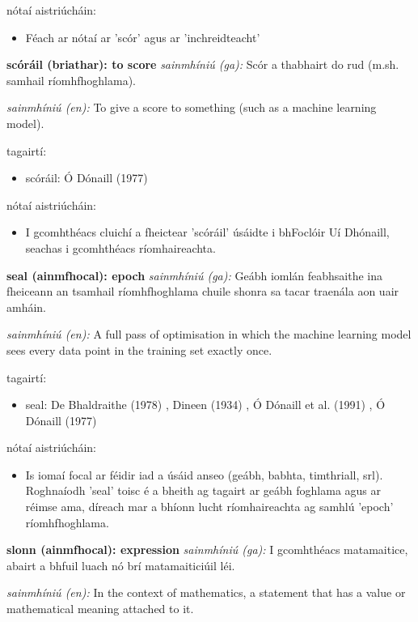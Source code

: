 \documentclass{article}
\begin{document}
nótaí aistriúcháin:
\begin{itemize}
	\item Féach ar nótaí ar 'scór' agus ar 'inchreidteacht'
\end{itemize}


\textbf{scóráil (briathar): to score}
\textit{sainmhíniú (ga):} Scór a thabhairt do rud (m.sh. samhail ríomhfhoghlama).

\textit{sainmhíniú (en):} To give a score to something (such as a machine learning model).

tagairtí:
\begin{itemize}
	\item scóráil: Ó Dónaill (1977) \cite{odonaill}
\end{itemize}

nótaí aistriúcháin:
\begin{itemize}
	\item I gcomhthéacs cluichí a fheictear 'scóráil' úsáidte i bhFoclóir Uí Dhónaill, seachas i gcomhthéacs ríomhaireachta.
\end{itemize}


\textbf{seal (ainmfhocal): epoch}
\textit{sainmhíniú (ga):}  Geábh iomlán feabhsaithe ina fheiceann an tsamhail ríomhfhoghlama chuile shonra sa tacar traenála aon uair amháin.

\textit{sainmhíniú (en):} A full pass of optimisation in which the machine learning model sees every data point in the training set exactly once.

tagairtí:
\begin{itemize}
	\item seal: De Bhaldraithe (1978) \cite{de-bhaldraithe}, Dineen (1934) \cite{dineen}, Ó Dónaill et al. (1991) \cite{focloir-beag}, Ó Dónaill (1977) \cite{odonaill}
\end{itemize}

nótaí aistriúcháin:
\begin{itemize}
	\item Is iomaí focal ar féidir iad a úsáid anseo (geábh, babhta, timthriall, srl). Roghnaíodh 'seal' toisc é a bheith ag tagairt ar geábh foghlama agus ar réimse ama, díreach mar a bhíonn lucht ríomhaireachta ag samhlú 'epoch' ríomhfhoghlama.
\end{itemize}


\textbf{slonn (ainmfhocal): expression}
\textit{sainmhíniú (ga):} I gcomhthéacs matamaitice, abairt a bhfuil luach nó brí matamaiticiúil léi.

\textit{sainmhíniú (en):} In the context of mathematics, a statement that has a value or mathematical meaning attached to it.
\end{document}
